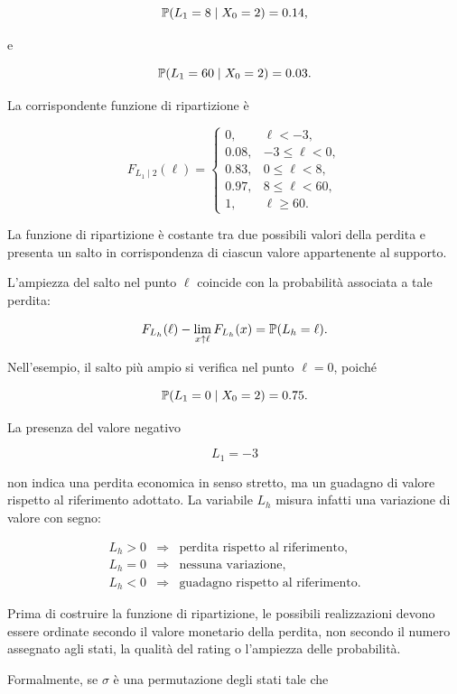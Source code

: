 \[
\mathbb{P}(L_1=8\mid X_0=2)=0.14,
\]

e

\[
\mathbb{P}(L_1=60\mid X_0=2)=0.03.
\]

La corrispondente funzione di ripartizione \`{e}

\[
F_{L_1\mid 2}(\ell)
=
\begin{cases}
0,
&
\ell<-3,
\\[1mm]
0.08,
&
-3\leq\ell<0,
\\[1mm]
0.83,
&
0\leq\ell<8,
\\[1mm]
0.97,
&
8\leq\ell<60,
\\[1mm]
1,
&
\ell\geq60.
\end{cases}
\]

La funzione di ripartizione \`{e} costante tra due possibili valori
della perdita e presenta un salto in corrispondenza di ciascun valore
appartenente al supporto.

L'ampiezza del salto nel punto $\ell$ coincide con la probabilit\`{a}
associata a tale perdita:

\[
F_{L_h}(\ell)
-
\lim_{x\uparrow\ell}F_{L_h}(x)
=
\mathbb{P}(L_h=\ell).
\]

Nell'esempio, il salto pi\`{u} ampio si verifica nel punto
$\ell=0$, poich\'{e}

\[
\mathbb{P}(L_1=0\mid X_0=2)=0.75.
\]

La presenza del valore negativo

\[
L_1=-3
\]

non indica una perdita economica in senso stretto, ma un guadagno di
valore rispetto al riferimento adottato. La variabile $L_h$ misura
infatti una variazione di valore con segno:

\[
\begin{array}{lll}
L_h>0
&
\Longrightarrow
&
\text{perdita rispetto al riferimento},
\\[1mm]
L_h=0
&
\Longrightarrow
&
\text{nessuna variazione},
\\[1mm]
L_h<0
&
\Longrightarrow
&
\text{guadagno rispetto al riferimento}.
\end{array}
\]

\begin{remark}
Prima di costruire la funzione di ripartizione, le possibili
realizzazioni devono essere ordinate secondo il valore monetario della
perdita, non secondo il numero assegnato agli stati, la qualit\`{a} del
rating o l'ampiezza delle probabilit\`{a}.
\end{remark}

Formalmente, se $\sigma$ \`{e} una permutazione degli stati tale che

